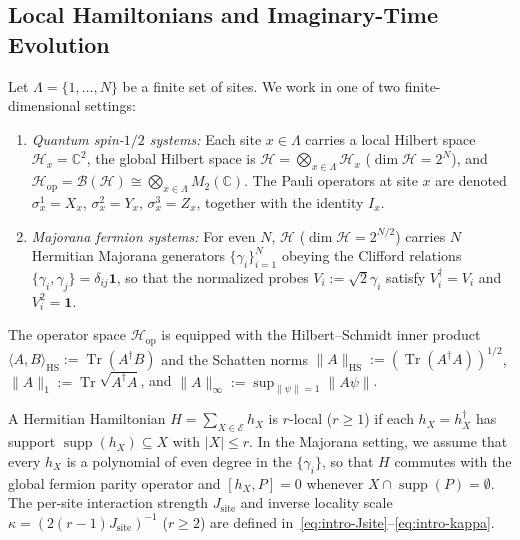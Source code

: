 \documentclass[11pt,a4paper]{article}
\numberwithin{equation}{section}
\theoremstyle{plain}
\theoremstyle{definition}
\newcommand{\Hop}{\mathcal{H}_{\mathrm{op}}}
\newcommand{\HS}{\mathrm{HS}}
\newcommand{\Tr}{\operatorname{Tr}}
\newcommand{\supp}{\operatorname{supp}}
\begin{document}
\subsection{Local Hamiltonians and Imaginary-Time Evolution}\label{subsec:local-ham}

Let $\Lambda = \{1,\dots,N\}$ be a finite set of sites. We work in one of two finite-dimensional settings:
\begin{enumerate}
  \setlength{\itemsep}{2pt}\setlength{\parskip}{0pt}
  \item[\emph{(i)}] \emph{Quantum spin-$1/2$ systems:} Each site $x\in\Lambda$ carries a local Hilbert space $\mathcal{H}_x = \mathbb{C}^2$, the global Hilbert space is $\mathcal{H} = \bigotimes_{x\in\Lambda}\mathcal{H}_x$ ($\dim\mathcal{H} = 2^N$), and $\Hop = \mathcal{B}(\mathcal{H}) \cong \bigotimes_{x\in\Lambda} M_2(\mathbb{C})$. The Pauli operators at site $x$ are denoted $\sigma_x^1 = X_x$, $\sigma_x^2 = Y_x$, $\sigma_x^3 = Z_x$, together with the identity $I_x$.
  \item[\emph{(ii)}] \emph{Majorana fermion systems:} For even $N$, $\mathcal{H}$ ($\dim\mathcal{H} = 2^{N/2}$) carries $N$ Hermitian Majorana generators $\{\gamma_i\}_{i=1}^N$ obeying the Clifford relations $\{\gamma_i,\gamma_j\} = \delta_{ij}\mathbf{1}$, so that the normalized probes $V_i := \sqrt{2}\gamma_i$ satisfy $V_i^\dagger = V_i$ and $V_i^2 = \mathbf{1}$.
\end{enumerate}
The operator space $\Hop$ is equipped with the Hilbert--Schmidt inner product $\langle A,B\rangle_\HS := \Tr(A^\dagger B)$ and the Schatten norms $\|A\|_\HS := (\Tr(A^\dagger A))^{1/2}$, $\|A\|_1 := \Tr\sqrt{A^\dagger A}$, and $\|A\|_\infty := \sup_{\|\psi\|=1}\|A\psi\|$.

A Hermitian Hamiltonian $H = \sum_{X\in\mathcal{E}} h_X$ is $r$-local ($r\ge 1$) if each $h_X = h_X^\dagger$ has support $\supp(h_X) \subseteq X$ with $|X| \le r$. In the Majorana setting, we assume that every $h_X$ is a polynomial of even degree in the $\{\gamma_i\}$, so that $H$ commutes with the global fermion parity operator and $[h_X, P] = 0$ whenever $X \cap \supp(P) = \emptyset$. The per-site interaction strength $J_{\mathrm{site}}$ and inverse locality scale $\kappa = (2(r-1)J_{\mathrm{site}})^{-1}$ ($r\ge 2$) are defined in~\eqref{eq:intro-Jsite}--\eqref{eq:intro-kappa}.
\end{document}
